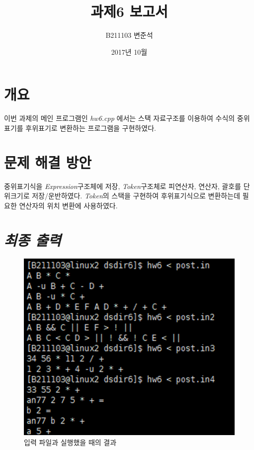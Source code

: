 \documentclass[a4paper,12pt]{article}
\begin{document}
 
    
    \title{과제6 보고서}
    \author{B211103 변준석}
    \date{2017년 10월}
    \maketitle

    \newpage
    \section{개요}
    이번 과제의 메인 프로그램인 \textsl{hw6.cpp} 에서는 스택 자료구조를 이용하여 수식의 중위표기를 후위표기로 변환하는 프로그램을 구현하였다.
    
    \section{문제 해결 방안}
    중위표기식을 \textsl{Expression}구조체에 저장, \textsl{Token}구조체로 피연산자, 연산자, 괄호를 단위크기로 저장/운반하였다.  \textsl{Token}의 스택을 구현하여 후위표기식으로 변환하는데 필요한 연산자의 위치 변환에 사용하였다.
    
    \section{\textsl{최종 출력}}
    \newpage
    \begin{figure}[t]\vspace*{4pt} 
    \centerline{\includegraphics[width=1.0\columnwidth]{result}} 
    \caption{입력 파일과 실행했을 때의 결과}\vspace*{-6pt} 
    \label{figure:result} 
    \end{figure} 
    
\end{document}
